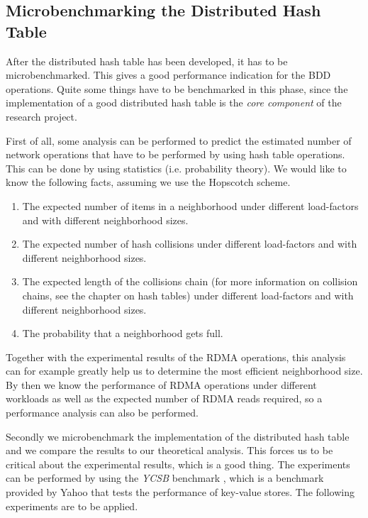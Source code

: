 \subsection{Microbenchmarking the Distributed Hash Table}
After the distributed hash table has been developed, it has to be microbenchmarked. This gives a good performance indication for the BDD operations. Quite some things have to be benchmarked in this phase, since the implementation of a good distributed hash table is the \emph{core component} of the research project. 

First of all, some analysis can be performed to predict the estimated number of network operations that have to be performed by using hash table operations. This can be done by using statistics (i.e. probability theory). We would like to know the following facts, assuming we use the Hopscotch scheme.

\begin{enumerate}
	\item The expected number of items in a neighborhood under different load-factors and with different neighborhood sizes.
	\item The expected number of hash collisions under different load-factors and with different neighborhood sizes.
	\item The expected length of the collisions chain (for more information on collision chains, see the chapter on hash tables) under different load-factors and with different neighborhood sizes.
	\item The probability that a neighborhood gets full.
\end{enumerate}

Together with the experimental results of the RDMA operations, this analysis can for example greatly help us to determine the most efficient neighborhood size. By then we know the performance of RDMA operations under different workloads as well as the expected number of RDMA reads required, so a performance analysis can also be performed.

Secondly we microbenchmark the implementation of the distributed hash table and we compare the results to our theoretical analysis. This forces us to be critical about the experimental results, which is a good thing. The experiments can be performed by using the \emph{YCSB} benchmark \cite{cooper2010benchmarking}, which is a benchmark provided by Yahoo that tests the performance of key-value stores. The following experiments are to be applied.


